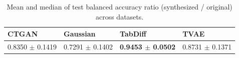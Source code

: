 \begin{table}
\centering
\caption{Mean and median of test balanced accuracy ratio (synthesized / original) across datasets.}
\label{tab:mle_report}
\begin{tabular}{llll}
\toprule
CTGAN & Gaussian & TabDiff & TVAE \\
\midrule
0.8350 $\pm$ 0.1419 & 0.7291 $\pm$ 0.1402 & \textbf{0.9453 $\pm$ 0.0502} & 0.8731 $\pm$ 0.1371 \\
\bottomrule
\end{tabular}
\end{table}
